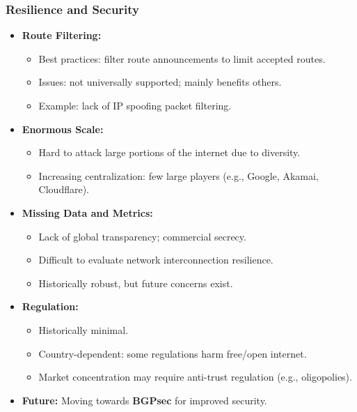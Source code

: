 \subsubsection{Resilience and Security}
\begin{itemize}
    \item \textbf{Route Filtering:}
    \begin{itemize}
        \item Best practices: filter route announcements to limit accepted routes.
        \item Issues: not universally supported; mainly benefits others.
        \item Example: lack of IP spoofing packet filtering.
    \end{itemize}
    \item \textbf{Enormous Scale:}
    \begin{itemize}
        \item Hard to attack large portions of the internet due to diversity.
        \item Increasing centralization: few large players (e.g., Google, Akamai, Cloudflare).
    \end{itemize}
    \item \textbf{Missing Data and Metrics:}
    \begin{itemize}
        \item Lack of global transparency; commercial secrecy.
        \item Difficult to evaluate network interconnection resilience.
        \item Historically robust, but future concerns exist.
    \end{itemize}
    \item \textbf{Regulation:}
    \begin{itemize}
        \item Historically minimal.
        \item Country-dependent: some regulations harm free/open internet.
        \item Market concentration may require anti-trust regulation (e.g., oligopolies).
    \end{itemize}
    \item \textbf{Future:} Moving towards \textbf{BGPsec} for improved security.
\end{itemize}

